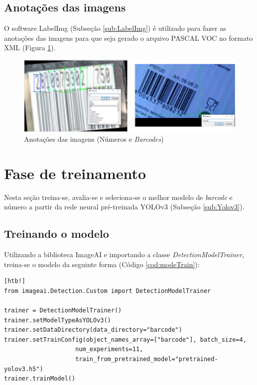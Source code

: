 \subsection{Anotações das imagens}

O software LabelImg (Subseção \ref{sub:LabelImg}) é utilizado para fazer as anotações das imagens para que seja gerado o arquivo PASCAL VOC no formato XML (Figura \ref{fig:barNumAn}).

\begin{figure}[htbp]
	\centering
	\includegraphics[width=0.9\linewidth]{figuras/MachineLearning/barNumAn.png}
	\caption{Anotações das imagens (Números e \textit{Barcodes})}
	\label{fig:barNumAn}
\end{figure}

\section{Fase de treinamento}

Nesta seção treina-se, avalia-se e seleciona-se o melhor modelo de \textit{barcode} e número a partir da rede neural pré-treinada YOLOv3 (Subseção \ref{sub:Yolov3}).

\subsection{Treinando o modelo}

Utilizando a biblioteca ImageAI e importando a classe \textit{DetectionModelTrainer}, treina-se o modelo da seguinte forma (Código \ref{cod:modeTrain}):

\begin{lstlisting}[caption=Exemplo de código do método \textit{data augmentation}, label=cod:modeTrain][htb!]
from imageai.Detection.Custom import DetectionModelTrainer

trainer = DetectionModelTrainer()
trainer.setModelTypeAsYOLOv3()
trainer.setDataDirectory(data_directory="barcode")
trainer.setTrainConfig(object_names_array=["barcode"], batch_size=4, 
                    num_experiments=11,
                    train_from_pretrained_model="pretrained-yolov3.h5")   
trainer.trainModel()
\end{lstlisting}

